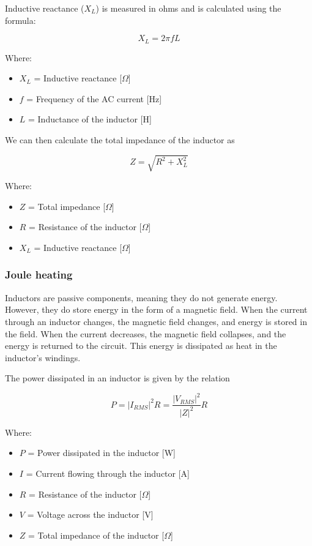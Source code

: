 Inductive reactance (\(X_L\)) is measured in ohms and is calculated using the formula:

\begin{equation}
    X_L = 2\pi fL
\end{equation}

Where:
\begin{itemize}
    \item \( X_L \) = Inductive reactance [\(\Omega\)]
    \item \( f \) = Frequency of the AC current [Hz]
    \item \( L \) = Inductance of the inductor [H]
\end{itemize}

We can then calculate the total impedance of the inductor as

\begin{equation}
    Z = \sqrt{R^2 + X_L^2}
\end{equation}

Where:
\begin{itemize}
    \item \( Z \) = Total impedance [\(\Omega\)]
    \item \( R \) = Resistance of the inductor [\(\Omega\)]
    \item \( X_L \) = Inductive reactance [\(\Omega\)]
\end{itemize}

\subsubsection{Joule heating}
Inductors are passive components, meaning they do not generate energy. However, they do store energy in the form of a magnetic field. When the current through an inductor changes, the magnetic field changes, and energy is stored in the field. When the current decreases, the magnetic field collapses, and the energy is returned to the circuit. This energy is dissipated as heat in the inductor's windings.

The power dissipated in an inductor is given by the relation

\begin{equation}
    P = |I_{RMS}|^2R = \frac{|V_{RMS}|^2}{|Z|^2}R\label{eq:Joule_heating}
\end{equation}

Where:
\begin{itemize}
    \item \( P \) = Power dissipated in the inductor [W]
    \item \( I \) = Current flowing through the inductor [A]
    \item \( R \) = Resistance of the inductor [\(\Omega\)]
    \item \( V \) = Voltage across the inductor [V]
    \item \( Z \) = Total impedance of the inductor [\(\Omega\)]
\end{itemize}

